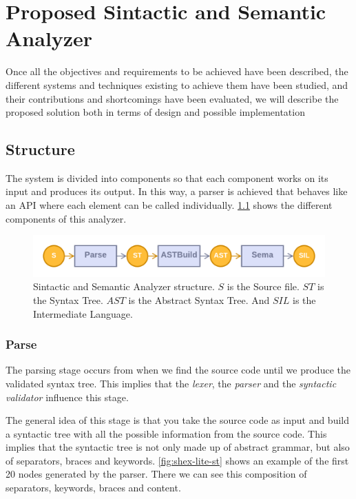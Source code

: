 \chapter{Proposed Sintactic and Semantic Analyzer}
\label{ch:proposed-sintactic-semantic-analyzer}

Once all the objectives and requirements to be achieved have been described,
the different systems and techniques existing to achieve them have been studied,
and their contributions and shortcomings have been evaluated, we will describe
the proposed solution both in terms of design and possible implementation

\section{Structure}
The system is divided into components so that each component works on its input
and produces its output. In this way, a parser is achieved that behaves like
an API where each element can be called individually. \cref{fig:shex-lite-sema}
shows the different components of this analyzer.

\begin{figure}
    \includegraphics[width=\textwidth]{images/shex-lite-sema.pdf}
    \centering
    \caption[Sintactic and Semantic Analyzer structure]{Sintactic and Semantic Analyzer structure. $S$
    is the Source file. $ST$ is the Syntax Tree. $AST$ is the Abstract Syntax Tree. And $SIL$ is the
    Intermediate Language.}
    \label{fig:shex-lite-sema}
\end{figure}

\subsection{Parse}
The parsing stage occurs from when we find the source code until we produce the
validated syntax tree. This implies that the \textit{lexer}, the \textit{parser} and the \textit{syntactic
validator} influence this stage. 

The general idea of this stage is that you take the source code as input and build a syntactic tree with all
the possible information from the source code. This implies that the syntactic tree is not only made up of
abstract grammar, but also of separators, braces and keywords. \cref{fig:shex-lite-st} shows an example
of the first 20 nodes generated by the parser. There we can see this composition of separators, keywords, braces
and content.

